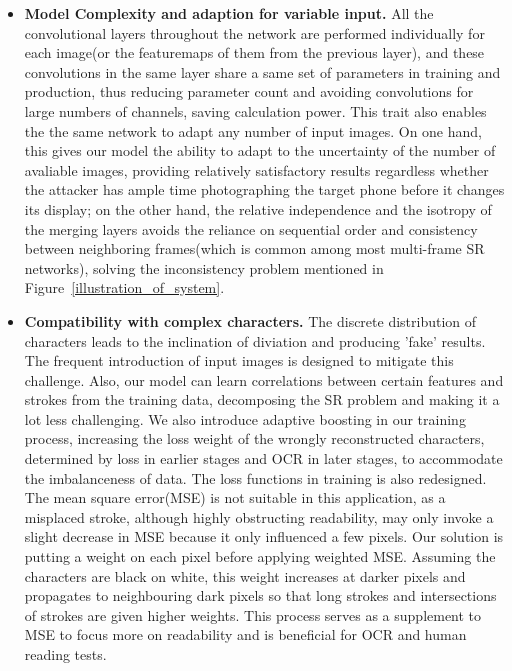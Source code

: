\begin{itemize}[leftmargin=*]
    \item \textbf{Model Complexity and adaption for variable input.} All the convolutional layers throughout the network are performed individually for each image(or the featuremaps of them from the previous layer), and these convolutions in the same layer share a same set of parameters in training and production, thus reducing parameter count and avoiding convolutions for large numbers of channels, saving calculation power. This trait also enables the  the same network to adapt any number of input images. On one hand, this gives our model the ability to adapt to the uncertainty of the number of avaliable images, providing relatively satisfactory results regardless whether the attacker has ample time photographing the target phone before it changes its display; on the other hand, the relative independence and the isotropy of the merging layers avoids the reliance on sequential order and consistency between neighboring frames(which is common among most multi-frame SR networks), solving the inconsistency problem mentioned in Figure~\ref{illustration_of_system}.
    \item \textbf{Compatibility with complex characters.} The discrete distribution of characters leads to the inclination of diviation and producing 'fake' results. The frequent introduction of input images is designed to mitigate this challenge. Also, our model can learn correlations between certain features and strokes from the training data, decomposing the SR problem and making it a lot less challenging. We also introduce adaptive boosting\cite{adaboost} in our training process, increasing the loss weight of the wrongly reconstructed characters, determined by loss in earlier stages and OCR in later stages, to accommodate the imbalanceness of data. The loss functions in training is also redesigned. The mean square error(MSE) is not suitable in this application, as a misplaced stroke, although highly obstructing readability, may only invoke a slight decrease in MSE because it only influenced a few pixels. Our solution is putting a weight on each pixel before applying weighted MSE. Assuming the characters are black on white, this weight increases at darker pixels and propagates to neighbouring dark pixels so that long strokes and intersections of strokes are given higher weights. This process serves as a supplement to MSE to focus more on readability and is beneficial for OCR and human reading tests. 
  \end{itemize}

